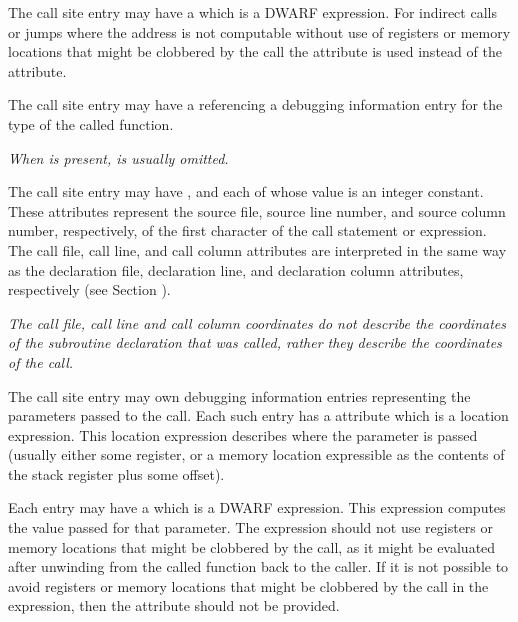 The call site entry may have a 
\DWATcalltargetclobberedNAME{}
which is a DWARF expression.  For indirect calls or jumps where the
address is not computable without use of registers or memory locations that
might be clobbered by the call the \DWATcalltargetclobberedNAME{}
attribute is used instead of the \DWATcalltarget{} attribute.

The call site entry may have a \DWATtypeNAME{}
referencing a debugging information entry for the type of the called function.  

\textit{When \DWATcallorigin{} is present, \DWATtypeNAME{} is usually omitted.}

The call site entry may have 
\DWATcallfileNAME{}, \DWATcalllineNAME{} and \DWATcallcolumnNAME{} 
each of whose value is an integer constant.
These attributes represent the source file, source line number, and source
column number, respectively, of the first character of the call statement or
expression.  The call file, call line, and call column attributes are
interpreted in the same way as the declaration file, declaration
line, and declaration column attributes, respectively 
(see Section ).

\textit{The call file, call line and call column coordinates do not describe the
coordinates of the subroutine declaration that was called, rather they describe
the coordinates of the call.}

The call site entry may own \DWTAGcallsiteparameterTARG{} debugging information
entries representing the parameters passed to the call.
Each such entry has a \DWATlocation{} attribute which is a location expression.
This location expression describes where the parameter is passed
(usually either some register, or a memory location expressible as the
contents of the stack register plus some offset).

Each \DWTAGcallsiteparameter{} entry may have a 
\DWATcallvalueNAME{}
which is a DWARF expression.  This expression computes the value
passed for that parameter.  The expression should not use registers or memory
locations that might be clobbered by the call, as it might be evaluated after
unwinding from the called function back to the caller.  If it is not
possible to avoid registers or memory locations that might be clobbered by
the call in the expression, then the \DWATcallvalueNAME{} attribute should
not be provided.

